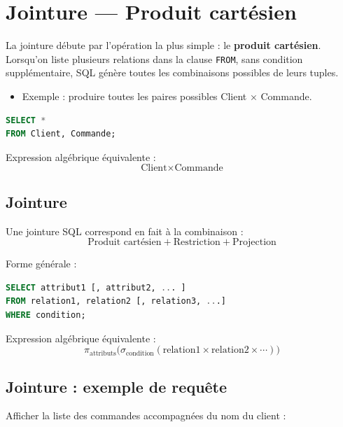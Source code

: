 \section{Jointure — Produit cartésien}

La jointure débute par l’opération la plus simple : le \textbf{produit cartésien}.  
Lorsqu’on liste plusieurs relations dans la clause \texttt{FROM}, sans condition supplémentaire, SQL génère toutes les combinaisons possibles de leurs tuples.

\begin{itemize}
    \item Exemple : produire toutes les paires possibles Client × Commande.
\end{itemize}

\begin{sqlcodebox}
\begin{lstlisting}[language=SQL]
SELECT *
FROM Client, Commande;
\end{lstlisting}
\end{sqlcodebox}

Expression algébrique équivalente :
\[
\text{Client} \times \text{Commande}
\]


\subsection{Jointure}

Une jointure SQL correspond en fait à la combinaison :
\[
\text{Produit cartésien} + \text{Restriction} + \text{Projection}
\]

Forme générale :

\begin{sqlcodebox}
\begin{lstlisting}[language=SQL]
SELECT attribut1 [, attribut2, ... ]
FROM relation1, relation2 [, relation3, ...]
WHERE condition;
\end{lstlisting}
\end{sqlcodebox}

Expression algébrique équivalente :
\[
\pi_{\text{attributs}} \big( \sigma_{\text{condition}} (\text{relation1} 
\times \text{relation2} \times \cdots ) \big)
\]


\subsection{Jointure : exemple de requête}

Afficher la liste des commandes accompagnées du nom du client :

